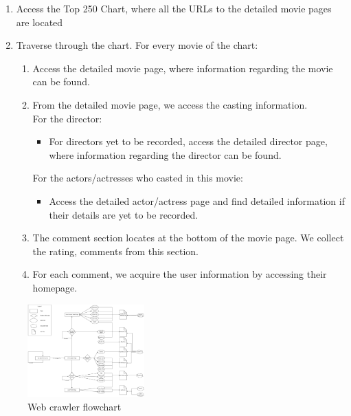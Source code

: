 \begin{CJK*}{UTF8}{gbsn}
\begin{enumerate}
    \item Access the Top 250 Chart, where all the URLs to the detailed movie pages are located
    \item Traverse through the chart. For every movie of the chart:
    \begin{enumerate}
        \item Access the detailed movie page, where information regarding the movie can be found.
        \item From the detailed movie page, we access the casting information.\\ For the director:
        \begin{itemize}
            \item For directors yet to be recorded, access the detailed director page, where information regarding the director can be found.
        \end{itemize}
        For the actors/actresses who casted in this movie:
        \begin{itemize}
            \item Access the detailed actor/actress page and find detailed information if their details are yet to be recorded.
        \end{itemize}
        \item The comment section locates at the bottom of the movie page. We collect the rating, comments from this section.
        \item For each comment, we acquire the user information by accessing their homepage.
    \end{enumerate}
\end{enumerate}

\begin{figure}[h]
    \label{crawler}
    \centering
    \includegraphics[width=0.4\textwidth]{crawler_flowchart.png}
    \caption{Web crawler flowchart}
\end{figure}


\end{CJK*}
